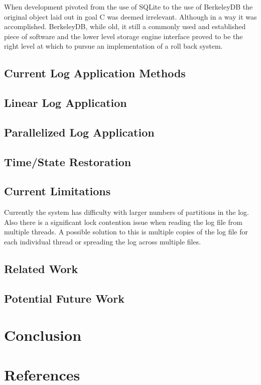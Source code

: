 \documentclass{article}
\begin{document}
When development pivoted from the use of SQLite to the use of BerkeleyDB the original object laid out in goal C was deemed irrelevant. Although in a way it was accomplished. BerkeleyDB, while old, it still a commonly used and established piece of software and the lower level storage engine interface proved to be the right level at which to pursue an implementation of a roll back system.

\subsection{Current Log Application Methods}

\subsection{Linear Log Application}
\subsection{Parallelized Log Application}
\subsection{Time/State Restoration}
\subsection{Current Limitations}
Currently the system has difficulty with larger numbers of partitions in the log. Also there is a significant lock contention issue when reading the log file from multiple threads. A possible solution to this is multiple copies of the log file for each individual thread or spreading the log across multiple files.
\subsection{Related Work}
\subsection{Potential Future Work}
\section{Conclusion}
\section{References}


\end{document}
